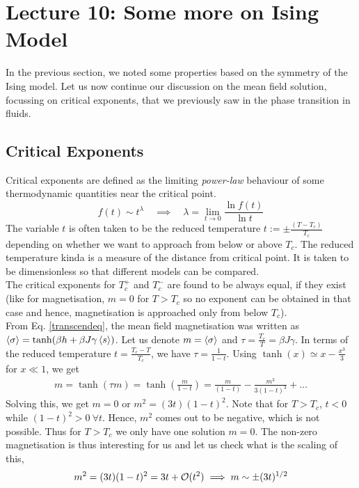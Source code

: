 \section*{Lecture 10: Some more on Ising Model}
In the previous section, we noted some properties based on the symmetry of the Ising model. Let us now continue our discussion on the mean field solution, focussing on critical exponents, that we previously saw in the phase transition in fluids. 
\subsection{Critical Exponents}
Critical exponents are defined as the limiting \textit{power-law} behaviour of some thermodynamic quantities near the critical point. 
$$f(t)\sim t^\lambda \quad \implies \quad \lambda = \lim\limits_{t\to 0}\frac{\ln f(t)}{\ln t}$$
The variable $t$ is often taken to be the reduced temperature $t:=\pm\frac{(T-T_c)}{T_c}$ depending on whether we want to approach from below or above $T_c$. The reduced temperature kinda is a measure of the distance from critical point. It is taken to be dimensionless so that different models can be compared.\\[0.2cm] The critical exponents for $T_c^+$ and $T_c^-$ are found to be always equal, if they exist (like for magnetisation, $m=0$ for $T>T_c$ so no exponent can be obtained in that case and hence, magnetisation is approached only from below $T_c$).\\[0.2cm]
From Eq. \eqref{transcendeq}, the mean field magnetisation was written as $\left\langle \sigma \right\rangle= \tanh(\beta h + \beta J \gamma \left\langle s \right\rangle)$. Let us denote $m=\left\langle \sigma \right\rangle$ and $\tau = \frac{T_c}{T} = \beta J\gamma$. In terms of the reduced temperature $t = \frac{T_c-T}{T_c}$, we have $\tau = \frac{1}{1-t}$. Using $\tanh(x)\simeq x - \frac{x^3}{3}$ for $x\ll 1$, we get
\begin{align*}
    m = \tanh(\tau m) = \tanh(\frac{m}{1-t}) = \frac{m}{(1-t)} - \frac{m^3}{3(1-t)^3} + \ldots
\end{align*}
Solving this, we get $m=0$ or $m^2= (3t)(1-t)^2$. Note that for $T>T_c$, $t<0$ while $(1-t)^2>0 \ \forall t$. Hence, $m^2$ comes out to be negative, which is not possible. Thus for $T>T_c$ we only have one solution $m=0$. The non-zero magnetisation is thus interesting for us and let us check what is the scaling of this,
\begin{align*}
   m^2 = (3t)(1-t)^2 = 3t + \mathcal O(t^2) \implies m\sim \pm (3t)^{1/2}
\end{align*}
